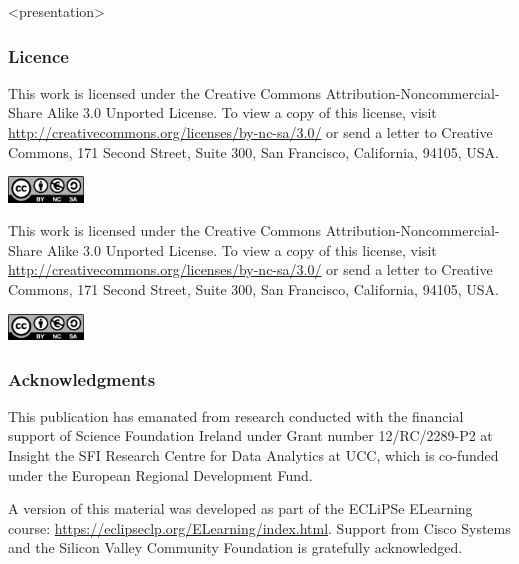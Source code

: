 \mode*
\maketitle

\begin{frame}
  \titlepage
\end{frame}

\begin{frame}<presentation>
\frametitle{Licence}
This work is licensed under the Creative Commons Attribution-Noncommercial-Share Alike 3.0 Unported License. To view a copy of this license, visit \url{http://creativecommons.org/licenses/by-nc-sa/3.0/} or send a letter to Creative Commons, 171 Second Street, Suite 300, San Francisco, California, 94105, USA.

\includegraphics[width=2cm]{../template/by-nc-sa}
\end{frame}

This work is licensed under the Creative Commons Attribution-Noncommercial-Share Alike 3.0 Unported License. To view a copy of this license, visit \url{http://creativecommons.org/licenses/by-nc-sa/3.0/} or send a letter to Creative Commons, 171 Second Street, Suite 300, San Francisco, California, 94105, USA.

\includegraphics[width=2cm]{../template/by-nc-sa}

\begin{frame}
\frametitle{Acknowledgments}
This publication has emanated from research conducted with the financial support of Science Foundation Ireland under Grant number  12/RC/2289-P2 at Insight the SFI Research Centre for Data Analytics at UCC, which is co-funded under the European Regional Development Fund.

A version of this material was developed as part of the ECLiPSe ELearning course: \url{https://eclipseclp.org/ELearning/index.html}. Support from Cisco Systems and the Silicon Valley Community Foundation is gratefully acknowledged. 
\end{frame}


\newpage
